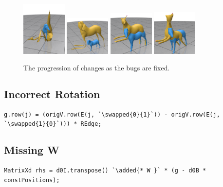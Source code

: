 \documentclass[12pt, a4paper]{article}
\newcommand{\highlight}[2]{\colorbox{#1}{\vphantom{Ay}#2}}
\newcommand{\removed}[1]{\highlight{pink}{#1}}
\newcommand{\added}[1]{\highlight{lime}{#1}}
\newcommand{\swapped}[2]{\removed{#1}\added{#2}}
\newcommand{\inline}[1]{\fbox{\texttt{#1}}}
\begin{document}
    \begin{figure}[H]
        \centering
        \includegraphics[width=0.2\textwidth]{images/1-0.png}
        \includegraphics[width=0.2\textwidth]{images/1-1.png}
        \includegraphics[width=0.2\textwidth]{images/1-2.png}
        \includegraphics[width=0.2\textwidth]{images/1-3.png}
            \caption{The progression of changes as the bugs are fixed.}
            \label{fig:1}
    \end{figure}

    \subsection{Incorrect Rotation}
        \begin{lstlisting}[caption={The \inline{0} and \inline{1} have been swapped.}, label={lst:a1}]
g.row(j) = (origV.row(E(j, `\swapped{0}{1}`)) - origV.row(E(j, `\swapped{1}{0}`))) * REdge;
\end{lstlisting}

    \subsection{Missing W}
        \begin{lstlisting}[caption={The \inline{* W } was missing.}, label={lst:b1}]
MatrixXd rhs = d0I.transpose() `\added{* W }` * (g - d0B * constPositions);
\end{lstlisting}
\end{document}
